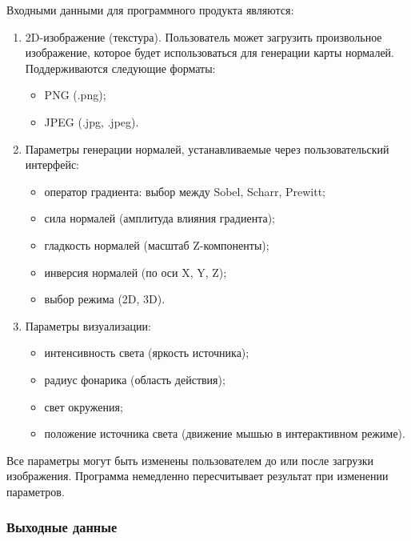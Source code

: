 Входными данными для программного продукта являются:
\begin{enumerate}
	\item 2D-изображение (текстура). Пользователь может загрузить произвольное изображение, которое будет использоваться для генерации карты нормалей. Поддерживаются следующие форматы:
	\begin{itemize}
		\item PNG (.png);
		\item JPEG (.jpg, .jpeg).
	\end{itemize}
	\item Параметры генерации нормалей, устанавливаемые через пользовательский интерфейс:
	\begin{itemize}
		\item оператор градиента: выбор между Sobel, Scharr, Prewitt;
		\item сила нормалей (амплитуда влияния градиента);
		\item гладкость нормалей (масштаб Z-компоненты);
		\item инверсия нормалей (по оси X, Y, Z);
		\item выбор режима (2D, 3D).
	\end{itemize}	
	\item Параметры визуализации:
	\begin{itemize}
		\item интенсивность света (яркость источника);
		\item радиус фонарика (область действия);
		\item свет окружения;
		\item положение источника света (движение мышью в интерактивном режиме).
	\end{itemize}	
\end{enumerate}

Все параметры могут быть изменены пользователем до или после загрузки изображения. Программа немедленно пересчитывает результат при изменении параметров.
\subsubsection{Выходные данные}


